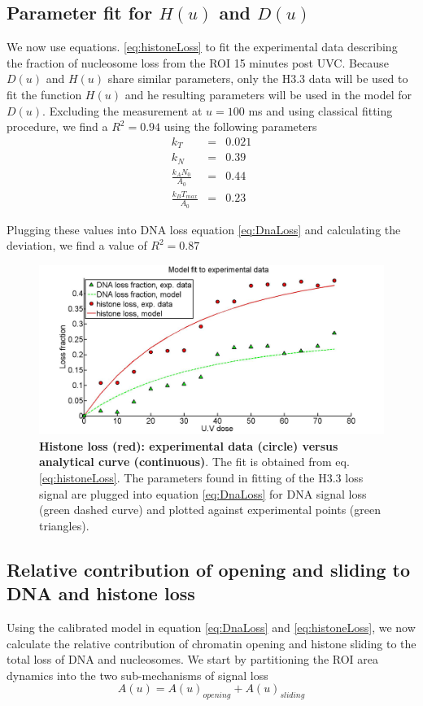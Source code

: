 \documentclass[12pt]{article}
\begin{document}
\subsection{Parameter fit for $H(u)$ and $D(u)$ }\label{subsection:parameterFit}
We now use equations. \ref{eq:histoneLoss} to fit the experimental data describing the fraction of nucleosome loss from the ROI 15 minutes post UVC. Because $D(u)$ and $H(u)$ share similar parameters, only the H3.3 data will be used to fit the function $H(u)$ and he resulting parameters will be used in the model for $D(u)$. 
Excluding the measurement at $u=100$ ms and using classical fitting procedure, we find a $R^2= 0.94$ using the following parameters
\begin{eqnarray*}
k_T &=&  0.021\\
k_N &=&  0.39\\
\frac{k_AN_0}{A_0}&=& 0.44\\
\frac{k_BT_{max}}{A_0}&=& 0.23
\end{eqnarray*}

Plugging these values into DNA loss equation \ref{eq:DnaLoss} and calculating the deviation, we find a value of $R^2=0.87$
\begin{figure}[H]
\centering
\includegraphics[width=0.6\linewidth, height=0.3\textheight]{histoneAndDnaVsUvDoseModelFit}
\caption{\textbf{Histone loss (red): experimental data (circle) versus analytical curve (continuous)}. The fit is obtained from  eq. \ref{eq:histoneLoss}. The parameters found in fitting of the H3.3 loss signal are plugged into equation \ref{eq:DnaLoss} for DNA signal loss (green dashed curve) and plotted against experimental points (green triangles).}
\label{fig:histoneAndDnaVsUvDoseModelFit}
\end{figure}

\subsection{Relative contribution of opening and sliding to DNA and histone loss}
Using the calibrated model in equation \ref{eq:DnaLoss} and \ref{eq:histoneLoss}, we now calculate the relative contribution of chromatin opening and histone sliding to the total loss of DNA and nucleosomes.
We start by partitioning the ROI area dynamics into the two sub-mechanisms of signal loss
\begin{equation*}
A(u) = A(u)_{opening}+A(u)_{sliding}
\end{equation*}
\end{document}
